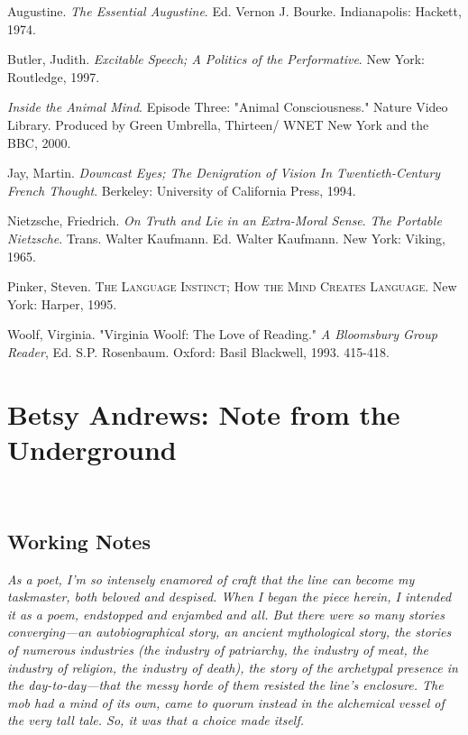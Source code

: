 \documentclass[
]{memoir}
\begin{document}
Augustine. \emph{The Essential Augustine}. Ed. Vernon J. Bourke.
Indianapolis: Hackett, 1974.

Butler, Judith. \emph{Excitable Speech; A Politics of the Performative}.
New York: Routledge, 1997.

\emph{Inside the Animal Mind}. Episode Three: "Animal Consciousness."
Nature Video Library. Produced by Green Umbrella, Thirteen/ WNET New
York and the BBC, 2000.

Jay, Martin. \emph{Downcast Eyes; The Denigration of Vision In
Twentieth-Century French Thought}. Berkeley: University of California
Press, 1994.

Nietzsche, Friedrich. \emph{On Truth and Lie in an Extra-Moral Sense}.
\emph{The Portable Nietzsche}. Trans. Walter Kaufmann. Ed. Walter
Kaufmann. New York: Viking, 1965.

Pinker, Steven. \textsc{The Language Instinct; How the Mind Creates
Language}. New York: Harper, 1995.

Woolf, Virginia. "Virginia Woolf: The Love of Reading." \emph{A
Bloomsbury Group Reader}, Ed. S.P. Rosenbaum. Oxford: Basil Blackwell,
1993. 415-418.

\hypertarget{betsy-andrews-note-from-the-underground}{%
\chapter{Betsy Andrews: Note from the
Underground}\label{betsy-andrews-note-from-the-underground}}

~

\hypertarget{working-notes}{%
\section*{Working Notes}\label{working-notes}}

\emph{As a poet, I'm so intensely enamored of craft that the line can
become my taskmaster, both beloved and despised. When I began the piece
herein, I intended it as a poem, endstopped and enjambed and all. But
there were so many stories converging---an autobiographical story, an
ancient mythological story, the stories of numerous industries (the
industry of patriarchy, the industry of meat, the industry of religion,
the industry of death), the story of the archetypal presence in the
day-to-day---that the messy horde of them resisted the line's enclosure.
The mob had a mind of its own, came to quorum instead in the alchemical
vessel of the very tall tale. So, it was that a choice made itself.}
\end{document}
